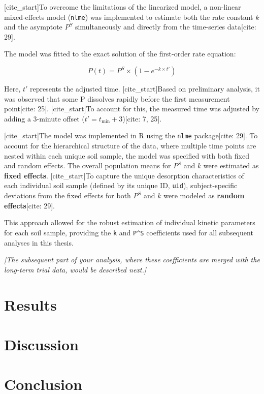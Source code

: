 \documentclass[
  letterpaper,
  DIV=11,
  numbers=noendperiod]{scrartcl}
\begin{document}
{[}cite\_start{]}To overcome the limitations of the linearized model, a
non-linear mixed-effects model (\texttt{nlme}) was implemented to
estimate both the rate constant \(k\) and the asymptote \(P^S\)
simultaneously and directly from the time-series data{[}cite: 29{]}.

The model was fitted to the exact solution of the first-order rate
equation:

\[ P(t) = P^S \times (1 - e^{-k \times t'}) \]

Here, \(t'\) represents the adjusted time. {[}cite\_start{]}Based on
preliminary analysis, it was observed that some P dissolves rapidly
before the first measurement point{[}cite: 25{]}. {[}cite\_start{]}To
account for this, the measured time was adjusted by adding a 3-minute
offset (\(t' = t_\text{min} + 3\)){[}cite: 7, 25{]}.

{[}cite\_start{]}The model was implemented in R using the \texttt{nlme}
package{[}cite: 29{]}. To account for the hierarchical structure of the
data, where multiple time points are nested within each unique soil
sample, the model was specified with both fixed and random effects. The
overall population means for \(P^S\) and \(k\) were estimated as
\textbf{fixed effects}. {[}cite\_start{]}To capture the unique
desorption characteristics of each individual soil sample (defined by
its unique ID, \texttt{uid}), subject-specific deviations from the fixed
effects for both \(P^S\) and \(k\) were modeled as \textbf{random
effects}{[}cite: 29{]}.

This approach allowed for the robust estimation of individual kinetic
parameters for each soil sample, providing the \texttt{k} and
\texttt{P\^{}S} coefficients used for all subsequent analyses in this
thesis.

\emph{{[}The subsequent part of your analysis, where these coefficients
are merged with the long-term trial data, would be described next.{]}}

\section{Results}\label{results}

\section{Discussion}\label{discussion}

\section{Conclusion}\label{conclusion}
\end{document}
